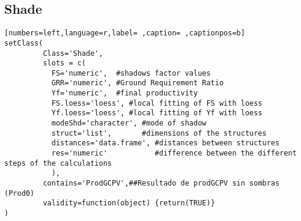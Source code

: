 \subsection{Shade}
\label{sec:org3f884f3}
\begin{lstlisting}[numbers=left,language=r,label= ,caption= ,captionpos=b]
setClass(
         Class='Shade',
         slots = c(
           FS='numeric',  #shadows factor values
           GRR='numeric', #Ground Requirement Ratio
           Yf='numeric',  #final productivity
           FS.loess='loess', #local fitting of FS with loess
           Yf.loess='loess', #local fitting of Yf with loess
           modeShd='character', #mode of shadow
           struct='list',       #dimensions of the structures
           distances='data.frame', #distances between structures
           res='numeric'           #difference between the different steps of the calculations
           ),
         contains='ProdGCPV',##Resultado de prodGCPV sin sombras (Prod0)
         validity=function(object) {return(TRUE)}
)
\end{lstlisting}
